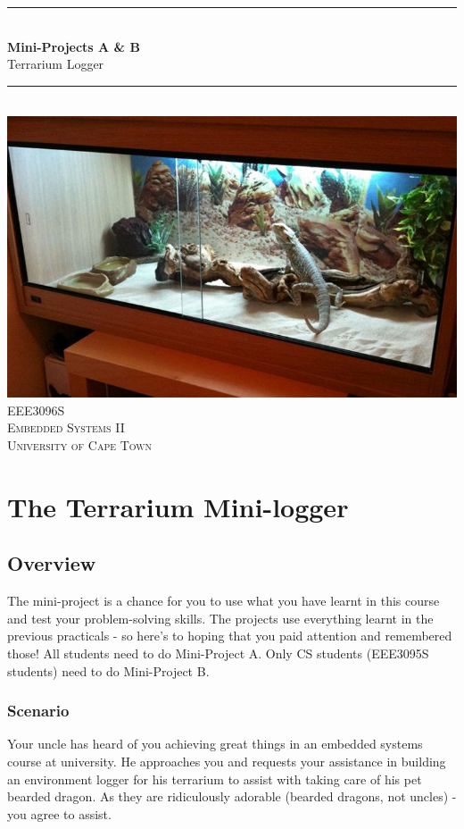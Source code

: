 \begin{center}
    \rule{\linewidth}{0.2 mm} \\[0.4 cm]
	{ \huge \bfseries Mini-Projects A \& B}\\
	\huge Terrarium Logger
	\rule{\linewidth}{0.2 mm} \\[1.5 cm]
	\includegraphics[scale = 0.5]{Figures/terrarium.jpg}\\[1 cm]
	\textsc{\Large EEE3096S}\\[0.5 cm]
	\textsc{\large Embedded Systems II}\\[0.5 cm]
	\textsc{\LARGE University of Cape Town}\\[0.5 cm]
\end{center}
\newpage
\chapter{The Terrarium Mini-logger}
\section{Overview}
The mini-project is a chance for you to use what you have learnt in this course and test your problem-solving skills. The projects use everything learnt in the previous practicals - so here's to hoping that you paid attention and remembered those! All students need to do Mini-Project A. Only CS students (EEE3095S students) need to do Mini-Project B.

\subsection{Scenario}
Your uncle has heard of you achieving great things in an embedded systems course at university. He approaches you and requests your assistance in building an environment logger for his terrarium to assist with taking care of his pet bearded dragon. As they are ridiculously adorable (bearded dragons, not uncles) - you agree to assist.

